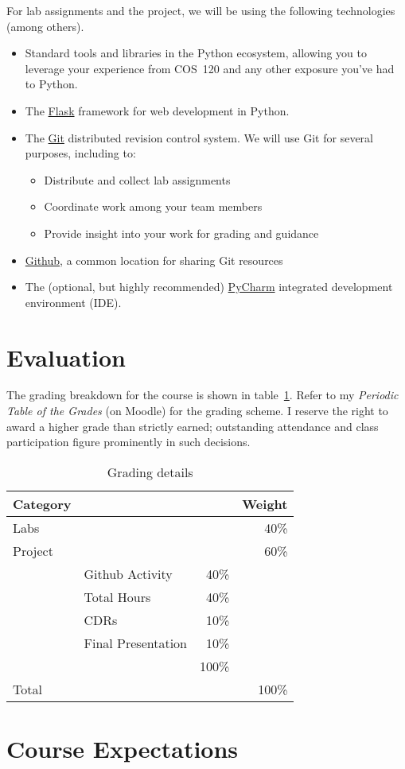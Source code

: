 \documentclass[11pt]{article}
\begin{document}
For lab assignments and the project,
we will be using the following technologies (among others).
\begin{itemize}
\item Standard tools and libraries in the Python ecosystem,
  allowing you to leverage your experience
  from COS~120 and any other exposure you've had to Python.
\item The \href{http://flask.pocoo.org/}{Flask}
  framework for web development in Python.
\item The \href{https://git-scm.com/}{Git}
  distributed revision control system.
  We will use Git
  for several purposes, including to:
  \begin{itemize}
  \item Distribute and collect lab assignments
  \item Coordinate work among your team members
  \item Provide insight into your work for grading and guidance
  \end{itemize}
\item \href{https://github.com/}{Github},
  a common location for sharing Git resources
\item The (optional, but highly recommended)
  \href{https://www.jetbrains.com/pycharm/}{PyCharm}
  integrated development environment (IDE).
\end{itemize}

\section{Evaluation}

The grading breakdown for the course
is shown in table~\ref{tab:grading}.
Refer to my \emph{Periodic Table of the Grades} (on Moodle)
for the grading scheme.
I reserve the right to award a higher grade than strictly earned;
outstanding attendance and class participation
figure prominently in such decisions.

\begin{table}[htb]
  \centering
  \begin{tabular}{llrr}
    \toprule
    Category &                    &       & Weight \\
    \midrule
    Labs     &                    &       & 40\%   \\
    Project  &                    &       & 60\%   \\
             & Github Activity    & 40\%  &        \\
             & Total Hours        & 40\%  &        \\
             & CDRs               & 10\%  &        \\
             & Final Presentation & 10\%  &        \\
             &                    & 100\% &        \\
    \midrule
    Total    &                    &       & 100\%  \\
    \bottomrule
  \end{tabular}
  \caption{Grading details}
  \label{tab:grading}
\end{table}

\section{Course Expectations}



\printbibliography{}
\end{document}
